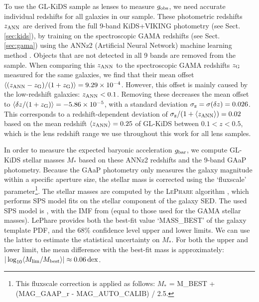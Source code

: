 \documentclass[usenatbib]{mnras}
\newcommand{\lan}{\langle}
\newcommand{\ran}{\rangle}
\newcommand*{\meanb}[1]{\langle{#1}\rangle}
\newcommand*{\E}[1]{\times 10^{#1}}
\newcommand{\un}[1]{_{\rm #1}}
\newcommand{\dex}{\, {\rm dex}}
\begin{document}
To use the GL-KiDS sample as lenses to measure $g\un{obs}$, we need accurate individual redshifts for all galaxies in our sample. These photometric redshifts $z\un{ANN}$ are derived from the full 9-band KiDS+VIKING photometry (see Sect. \ref{sec:kids}), by training on the spectroscopic GAMA redshifts (see Sect. \ref{sec:gama}) using the ANNz2 (Artificial Neural Network) machine learning method \cite[]{sadeh2016,dejong2017,bilicki2017}. Objects that are not detected in all 9 bands are removed from the sample. When comparing this $z\un{ANN}$ to the spectroscopic GAMA redshifts $z\un{G}$ measured for the same galaxies, we find that their mean offset $\meanb{(z\un{ANN} - z\un{G})/(1+z\un{G})} = 9.29\E{-4}$. However, this offset is mainly caused by the low-redshift galaxies: $z\un{ANN}<0.1$. Removing these decreases the mean offset to $\meanb{\delta z/(1+z\un{G})} = -5.86\E{-5}$, with a standard deviation $\sigma\un{z} = \sigma(\delta z) = 0.026$. This corresponds to a redshift-dependent deviation of $\sigma\un{z}/(1+\meanb{z\un{ANN}})=0.02$ based on the mean redshift $\meanb{z\un{ANN}} = 0.25$ of GL-KiDS between $0.1<z<0.5$, which is the lens redshift range we use throughout this work for all lens samples.

In order to measure the expected baryonic acceleration $g\un{bar}$, we compute GL-KiDS stellar masses $M_*$ based on these ANNz2 redshifts and the 9-band GAaP photometry. Because the GAaP photometry only measures the galaxy magnitude within a specific aperture size, the stellar mass is corrected using the `fluxscale' parameter\footnote{This fluxscale correction is applied as follows: $M_*$ = M\_BEST + (MAG\_GAAP\_r - MAG\_AUTO\_CALIB) / 2.5.}. The stellar masses are computed by the \textsc{LePhare} algorithm \cite[]{arnouts1999, ilbert2006}, which performs SPS model fits on the stellar component of the galaxy SED. The used SPS model is \cite{bruzual2003}, with the IMF from \cite{chabrier2003} (equal to those used for the GAMA stellar masses). LePhare provides both the best-fit value `MASS\_BEST' of the galaxy template PDF, and the $68\%$ confidence level upper and lower limits. We can use the latter to estimate the statistical uncertainty on $M_*$. For both the upper and lower limit, the mean difference with the best-fit mass is approximately: $|\log_{10}\lan M\un{lim}/M\un{best} \ran| \approx 0.06 \dex$.
\end{document}
